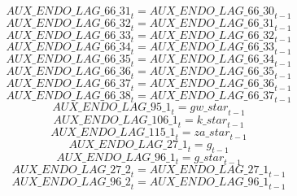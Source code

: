 \begin{dmath}
{AUX\_ENDO\_LAG\_66\_31}_{t}={AUX\_ENDO\_LAG\_66\_30}_{t-1}
\end{dmath}
\begin{dmath}
{AUX\_ENDO\_LAG\_66\_32}_{t}={AUX\_ENDO\_LAG\_66\_31}_{t-1}
\end{dmath}
\begin{dmath}
{AUX\_ENDO\_LAG\_66\_33}_{t}={AUX\_ENDO\_LAG\_66\_32}_{t-1}
\end{dmath}
\begin{dmath}
{AUX\_ENDO\_LAG\_66\_34}_{t}={AUX\_ENDO\_LAG\_66\_33}_{t-1}
\end{dmath}
\begin{dmath}
{AUX\_ENDO\_LAG\_66\_35}_{t}={AUX\_ENDO\_LAG\_66\_34}_{t-1}
\end{dmath}
\begin{dmath}
{AUX\_ENDO\_LAG\_66\_36}_{t}={AUX\_ENDO\_LAG\_66\_35}_{t-1}
\end{dmath}
\begin{dmath}
{AUX\_ENDO\_LAG\_66\_37}_{t}={AUX\_ENDO\_LAG\_66\_36}_{t-1}
\end{dmath}
\begin{dmath}
{AUX\_ENDO\_LAG\_66\_38}_{t}={AUX\_ENDO\_LAG\_66\_37}_{t-1}
\end{dmath}
\begin{dmath}
{AUX\_ENDO\_LAG\_95\_1}_{t}={gw\_star}_{t-1}
\end{dmath}
\begin{dmath}
{AUX\_ENDO\_LAG\_106\_1}_{t}={k\_star}_{t-1}
\end{dmath}
\begin{dmath}
{AUX\_ENDO\_LAG\_115\_1}_{t}={za\_star}_{t-1}
\end{dmath}
\begin{dmath}
{AUX\_ENDO\_LAG\_27\_1}_{t}={g}_{t-1}
\end{dmath}
\begin{dmath}
{AUX\_ENDO\_LAG\_96\_1}_{t}={g\_star}_{t-1}
\end{dmath}
\begin{dmath}
{AUX\_ENDO\_LAG\_27\_2}_{t}={AUX\_ENDO\_LAG\_27\_1}_{t-1}
\end{dmath}
\begin{dmath}
{AUX\_ENDO\_LAG\_96\_2}_{t}={AUX\_ENDO\_LAG\_96\_1}_{t-1}
\end{dmath}
